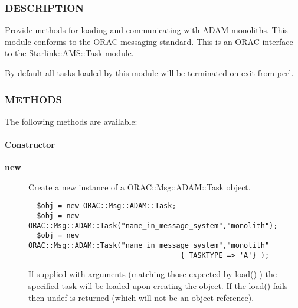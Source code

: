 \subsubsection*{DESCRIPTION\label{ORAC::Msg::ADAM::Task_DESCRIPTION}}

Provide methods for loading and communicating with ADAM monoliths.
This module conforms to the ORAC messaging standard. This is an
ORAC interface to the Starlink::AMS::Task module.



By default all tasks loaded by this module will be terminated
on exit from perl.

\subsubsection*{METHODS\label{ORAC::Msg::ADAM::Task_METHODS}}

The following methods are available:

\paragraph*{Constructor\label{ORAC::Msg::ADAM::Task_Constructor}}\begin{description}
\item[\textbf{new}] \mbox{}

Create a new instance of a ORAC::Msg::ADAM::Task object.

\begin{verbatim}
  $obj = new ORAC::Msg::ADAM::Task;
  $obj = new ORAC::Msg::ADAM::Task("name_in_message_system","monolith");
  $obj = new ORAC::Msg::ADAM::Task("name_in_message_system","monolith"
                                    { TASKTYPE => 'A'} );
\end{verbatim}


If supplied with arguments (matching those expected by load() ) the
specified task will be loaded upon creating the object. If the load()
fails then undef is returned (which will not be an object reference).

\end{description}
